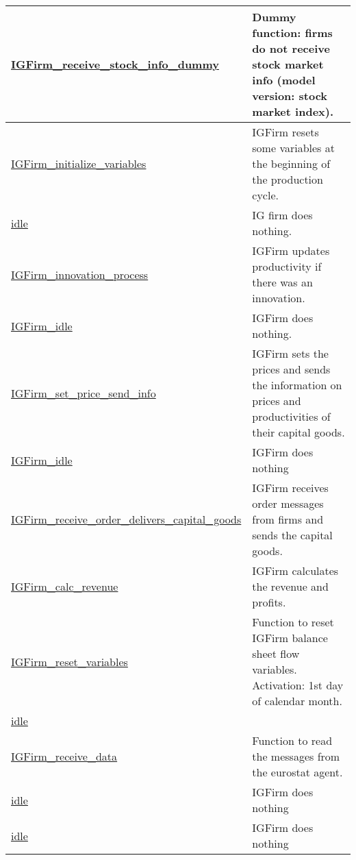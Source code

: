 \documentclass[a4paper,11pt]{article}
\begin{document}
\begin{longtable}[H!]{ll}
\midrule
\parbox{5cm}{\url{IGFirm_receive_stock_info_dummy}}  & \parbox{10cm}{Dummy function: firms do not receive stock market info (model version: stock market index).} \\
\midrule
\parbox{5cm}{\url{IGFirm_initialize_variables}}  & \parbox{10cm}{IGFirm resets some variables at the beginning of the production cycle.} \\
\midrule
\parbox{5cm}{\url{idle}}  & \parbox{10cm}{IG firm does nothing.} \\
\midrule
\parbox{5cm}{\url{IGFirm_innovation_process}}  & \parbox{10cm}{IGFirm updates productivity if there was an innovation.} \\
\midrule
\parbox{5cm}{\url{IGFirm_idle}}  & \parbox{10cm}{IGFirm does nothing.} \\
\midrule
\parbox{5cm}{\url{IGFirm_set_price_send_info}}  & \parbox{10cm}{IGFirm sets the prices and sends the information on prices and productivities of their capital goods.} \\
\midrule
\parbox{5cm}{\url{IGFirm_idle}}  & \parbox{10cm}{IGFirm does nothing} \\
\midrule
\parbox{5cm}{\url{IGFirm_receive_order_delivers_capital_goods}}  & \parbox{10cm}{IGFirm receives order messages from firms and sends the capital goods.} \\
\midrule
\parbox{5cm}{\url{IGFirm_calc_revenue}}  & \parbox{10cm}{IGFirm calculates the revenue and profits.} \\
\midrule
\parbox{5cm}{\url{IGFirm_reset_variables}}  & \parbox{10cm}{Function to reset IGFirm balance sheet flow variables. Activation: 1st day of calendar month.} \\
\midrule
\parbox{5cm}{\url{idle}}  & \parbox{10cm}{} \\
\midrule
\parbox{5cm}{\url{IGFirm_receive_data}}  & \parbox{10cm}{Function to read the messages from the eurostat agent.} \\
\midrule
\parbox{5cm}{\url{idle}}  & \parbox{10cm}{IGFirm does nothing} \\
\midrule
\parbox{5cm}{\url{idle}}  & \parbox{10cm}{IGFirm does nothing} \\

\end{longtable}
\end{document}
